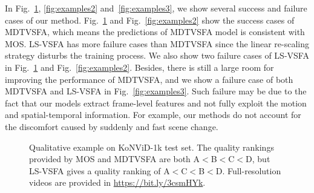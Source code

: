 \documentclass[twocolumn]{svjour3}          \smartqed  \usepackage{graphicx}
\begin{document}
In Fig.~\ref{fig:examples1}, \ref{fig:examples2} and~\ref{fig:examples3}, we show several success and failure cases of our method.
Fig.~\ref{fig:examples1} and Fig.~\ref{fig:examples2} show the success cases of MDTVSFA, which means the predictions of MDTVSFA model is consistent with MOS.
LS-VSFA has more failure cases than MDTVSFA since the linear re-scaling strategy disturbs the training process.
We also show two failure cases of LS-VSFA in Fig.~\ref{fig:examples1} and Fig.~\ref{fig:examples2}.
Besides, there is still a large room for improving the performance of MDTVSFA, and we show a failure case of both MDTVSFA and LS-VSFA in Fig.~\ref{fig:examples3}.
Such failure may be due to the fact that our models extract frame-level features and not fully exploit the motion and spatial-temporal information.
For example, our methods do not account for the discomfort caused by suddenly and fast scene change.

\begin{figure}[!htb]
\begin{center}
\hfill  
\hfill  
\hfill  
\hfill
\end{center}
  \caption{Qualitative example on KoNViD-1k test set. The quality rankings provided by MOS and MDTVSFA are both A$<$B$<$C$<$D, but LS-VSFA gives a quality ranking of A$<$C$<$B$<$D. Full-resolution videos are provided in \url{https://bit.ly/3csmHYk}.} 
 \label{fig:examples1}
\end{figure}
\end{document}
